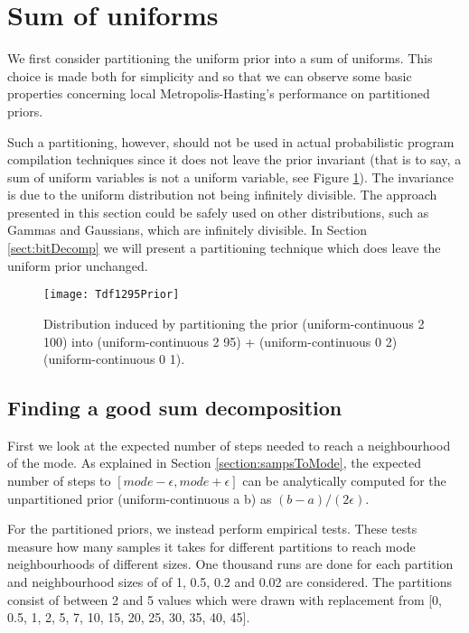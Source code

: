 \section{Sum of uniforms}
\label{sect:sumUnif}

We first consider partitioning the uniform prior into a sum of uniforms. This choice is made both for simplicity and so that we can observe some basic properties concerning local Metropolis-Hasting's performance on partitioned priors.

Such a partitioning, however, should not be used in actual probabilistic program compilation techniques since it does not leave the prior invariant (that is to say, a sum of uniform variables is not a uniform variable, see Figure \ref{fig:1295Prior}). The invariance is due to the uniform distribution not being infinitely divisible. The approach presented in this section could be safely used on other distributions, such as Gammas and Gaussians, which are infinitely divisible. In Section \ref{sect:bitDecomp} we will present a partitioning technique which does leave the uniform prior unchanged.

\begin{figure}[h]
    \centering
    \texttt{[image: Tdf1295Prior]}
    \caption{Distribution induced by partitioning the prior (uniform-continuous 2 100) into (uniform-continuous 2 95) + (uniform-continuous 0 2) (uniform-continuous 0 1).}
    \label{fig:1295Prior}
\end{figure}

\subsection{Finding a good sum decomposition}
\label{sect:goodSum}
First we look at the expected number of steps needed to reach a neighbourhood of the mode. As explained in Section \ref{section:sampsToMode}, the expected number of steps to $[mode - \epsilon, mode + \epsilon]$ can be analytically computed for the unpartitioned prior (uniform-continuous a b) as $(b-a)/(2\epsilon)$.

For the partitioned priors, we instead perform empirical tests. These tests measure how many samples it takes for different partitions to reach mode neighbourhoods of different sizes. One thousand runs are done for each partition and neighbourhood sizes of of 1, 0.5, 0.2 and 0.02 are considered. The partitions consist of between 2 and 5 values which were drawn with replacement from [0, 0.5, 1, 2, 5, 7, 10, 15, 20, 25, 30, 35, 40, 45].

